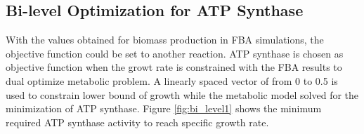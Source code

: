 \begin{table}[H]
\vspace{0.5cm}
\caption[Producing and consuming reaction fluxes for the metabolite oxaloacetate (OXA).]{Producing and consuming reaction fluxes for the metabolite oxaloacetate (OXA).}
\setlength{\tabcolsep}{4pt}
\label{table:12OXA}
\end{table}


\subsection{Bi-level Optimization for ATP Synthase}
With the values obtained for biomass production in FBA simulations, the objective function could be set to another reaction. ATP synthase is chosen as objective function when the growt rate is constrained with the FBA results to dual optimize metabolic problem. A linearly spaced vector of from 0 to 0.5 is used to constrain lower bound of growth while the metabolic model solved for the minimization of ATP synthase. Figure \ref{fig:bi_level1} shows the minimum required ATP synthase activity to reach specific growth rate.

